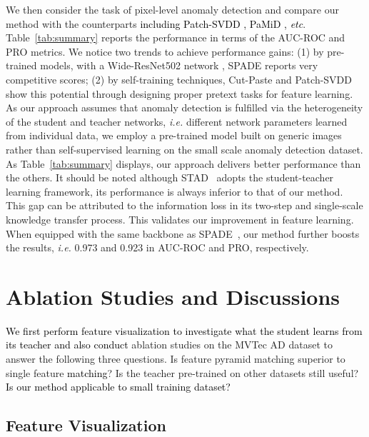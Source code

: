 \documentclass{bmvc2k}
\newcommand{\wgd}[1]{\textcolor{black}{{}#1}}
\begin{document}
We then consider the task of pixel-level anomaly detection and compare our method with the counterparts \wgd{including Patch-SVDD \cite{yi2020patch}, PaMiD \cite{defard2021padim}, \emph{etc}}. Table~\ref{tab:summary} reports the performance in terms of the AUC-ROC and PRO metrics. We notice two trends to achieve performance gains: (1) by pre-trained models, with a Wide-ResNet502 network \cite{zagoruyko2016wide}, SPADE reports very competitive scores; (2) by self-training techniques, Cut-Paste \cite{li2021cutpaste} and Patch-SVDD \cite{yi2020patch} show this potential through designing proper pretext tasks for feature learning. As our approach assumes that anomaly detection is fulfilled via the heterogeneity of the student and teacher networks, \emph{i.e.} different network parameters learned from individual data, we employ a pre-trained model built on generic images rather than self-supervised learning on the small scale anomaly detection dataset. As Table~\ref{tab:summary} displays, our approach delivers better performance than the others. It should be noted although STAD~\cite{Bergmann2020} adopts the student-teacher learning framework, its performance is always inferior to that of our method. This gap can be attributed to the information loss in its two-step and single-scale knowledge transfer process. This validates our improvement in feature learning. When equipped with the same backbone as SPADE~\cite{Cohen2020}, our method further boosts the results, \emph{i.e.} 0.973 and 0.923 in AUC-ROC and PRO, respectively.









\section{Ablation Studies and Discussions}
\label{sec5}




\wgd{We first perform feature visualization to investigate what the student learns from its teacher and also conduct} ablation studies on the MVTec AD dataset to answer the following three questions. Is feature pyramid matching superior to single feature \wgd{matching}? Is the teacher pre-trained on other datasets still useful? \wgd{Is our method applicable to small training dataset?}




\subsection{Feature Visualization}
\end{document}
